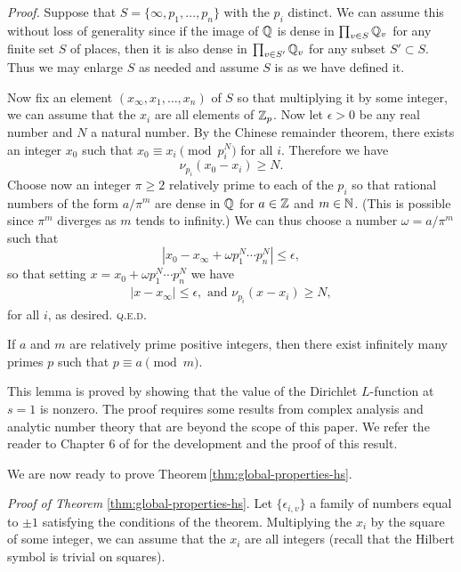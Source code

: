 \emph{Proof.} Suppose that \(S = \{\infty, p_1, \dots, p_n\}\) with the \(p_i\) distinct. We can assume this without loss of generality since if the image of \(\mathbb{Q}\) is dense in \(\prod_{v \in S} \mathbb{Q}_v\) for any finite set \(S\) of places, then it is also dense in \(\prod_{v \in S'} \mathbb{Q}_v\) for any subset \(S' \subset S\). Thus we may enlarge \(S\) as needed and assume \(S\) is as we have defined it.

Now fix an element \((x_{\infty}, x_1, \dots, x_n)\) of \(S\) so that multiplying it by some integer, we can assume that the \(x_i\) are all elements of \(\mathbb{Z}_p\). Now let \(\epsilon > 0\) be any real number and \(N\) a natural number. By the Chinese remainder theorem, there exists an integer \(x_0\) such that \(x_0 \equiv x_i \pmod{p_i^N}\) for all \(i\). Therefore we have
\[
    \nu_{p_i}(x_0 - x_i) \geq N.
\] 
Choose now an integer \(\pi \geq 2\) relatively prime to each of the \(p_i\)  so that rational numbers of the form \(a/\pi^m\) are dense in \(\mathbb{Q}\) for \(a \in \mathbb{Z}\) and \(m \in \mathbb{N}\). (This is possible since \(\pi^m\) diverges as \(m\) tends to infinity.) We can thus choose a number \(\omega = a/\pi^m\) such that
\[
    |x_0 - x_{\infty} + \omega p_1^N\cdots p_n^N| \leq \epsilon,
\]
so that setting \(x = x_0 + \omega p_1^N\cdots p_n^N\) we have
\begin{align*}
    |x - x_{\infty}| \leq \epsilon, \text{ and } \nu_{p_i}(x - x_i) \geq N,
\end{align*}
for all \(i\), as desired. {\scshape q.e.d.}

\medskip

\begin{lemma}\label{lem:dirichlet}
    {\normalfont\cite[p.~25]{serre2012course}}
    If \(a\) and \(m\) are relatively prime positive integers, then there exist infinitely many primes \(p\) such that \(p \equiv a \pmod{m}\).
\end{lemma}

This lemma is proved by showing that the value of the Dirichlet \(L\)-function at \(s = 1\) is nonzero. The proof requires some results from complex analysis and analytic number theory that are beyond the scope of this paper. We refer the reader to Chapter 6 of \cite{serre2012course} for the development and the proof of this result.

We are now ready to prove Theorem\,\ref{thm:global-properties-hs}.

\emph{Proof of Theorem} \ref{thm:global-properties-hs}. Let \(\{\epsilon_{i,v}\}\) a family of numbers equal to \(\pm 1\) satisfying the conditions of the theorem. Multiplying the \(x_i\) by the square of some integer, we can assume that the \(x_i\) are all integers (recall that the Hilbert symbol is trivial on squares).

